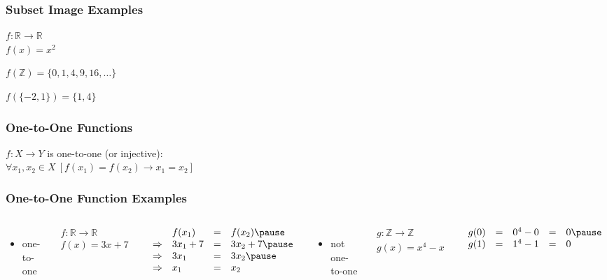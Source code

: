 \documentclass[dvipsnames]{beamer}
\begin{document}
\begin{frame}
  \frametitle{Subset Image Examples}

  $f: \mathbb{R} \rightarrow \mathbb{R}$\\
  $f(x) = x^2$

  \pause
  \bigskip
  $f(\mathbb{Z}) = \{0,1,4,9,16,\dots\}$

  \medskip
  $f(\{-2,1\}) = \{1,4\}$
\end{frame}

\begin{frame}
  \frametitle{One-to-One Functions}

  \begin{definition}
    $f: X \rightarrow Y$ is \alert{one-to-one} (or \alert{injective}):\\
      $\forall x_1,x_2 \in X~[f(x_1)=f(x_2) \rightarrow x_1=x_2]$
  \end{definition}
\end{frame}

\begin{frame}
  \frametitle{One-to-One Function Examples}

  \begin{columns}[t]
    \begin{itemize}
     \item one-to-one
    \end{itemize}

    \medskip
    $\begin{array}{l}
      f: \mathbb{R} \rightarrow \mathbb{R}\\
      f(x) = 3x + 7
    \end{array}$

    \pause
    \bigskip
    $\begin{array}{llll}
                  & f(x_1)    & = & f(x_2)\pause\\
      \Rightarrow & 3 x_1 + 7 & = & 3 x_2 + 7\pause\\
      \Rightarrow & 3 x_1     & = & 3 x_2\pause\\
      \Rightarrow & x_1       & = & x_2
    \end{array}$

    \pause
    \begin{itemize}
     \item not one-to-one
    \end{itemize}

    \medskip
    $\begin{array}{l}
      g: \mathbb{Z} \rightarrow \mathbb{Z}\\
      g(x) = x^4 - x
    \end{array}$

    \pause
    \bigskip
    $\begin{array}{lllll}
      g(0) & = & 0^4 - 0 & = & 0\pause\\
      g(1) & = & 1^4 - 1 & = & 0
    \end{array}$
  \end{columns}
\end{frame}
\end{document}
